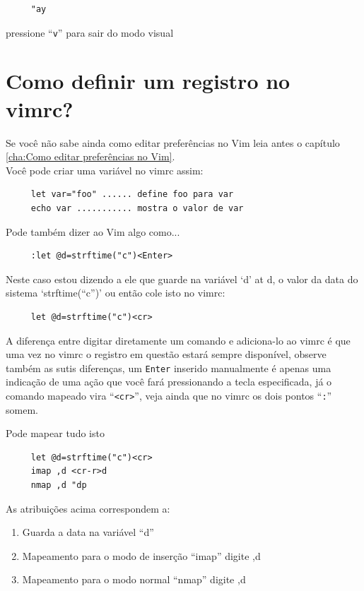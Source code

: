 \documentclass[10pt,a4paper,openany]{book}
\begin{document}
\begin{verbatim}
     "ay
\end{verbatim}

pressione ``\verb|v|'' para sair do modo visual

\section{Como definir um registro no vimrc?}
\label{Como definir um registro no vimrc?}

Se você não sabe ainda como editar preferências no Vim
leia antes o capítulo \ref{cha:Como editar preferências no Vim}. \\


Você pode criar uma variável no vimrc assim:

\begin{verbatim}
     let var="foo" ...... define foo para var
     echo var ........... mostra o valor de var
\end{verbatim}

Pode também dizer ao Vim algo como...

\begin{verbatim}
     :let @d=strftime("c")<Enter>
\end{verbatim}

Neste caso estou dizendo a ele que guarde na variável `d' at d,
o valor da data do sistema `strftime(``c'')' ou então cole isto no
vimrc:

\begin{verbatim}
     let @d=strftime("c")<cr>
\end{verbatim}

A diferença entre digitar diretamente um comando e adiciona-lo ao
vimrc é que uma vez no vimrc o registro em questão estará sempre
disponível, observe também as sutis diferenças, um {\tt Enter} inserido
manualmente é apenas uma indicação de uma ação que você fará
pressionando a tecla especificada, já o comando mapeado vira
``\verb|<cr>|'', veja ainda que no vimrc os dois pontos ``\verb|:|''
somem.

Pode mapear tudo isto

\begin{verbatim}
     let @d=strftime("c")<cr>
     imap ,d <cr-r>d
     nmap ,d "dp
\end{verbatim}

As atribuições acima correspondem a:

\begin{enumerate}
 \item  Guarda a data na variável ``d''
 \item  Mapeamento para o modo de inserção ``imap'' digite ,d
 \item  Mapeamento para o modo normal ``nmap'' digite ,d
\end{enumerate}
\end{document}
